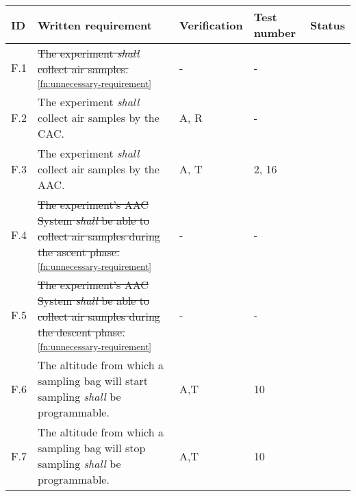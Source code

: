 \makeatletter
\renewcommand\@makefntext[1]{\leftskip=3em\hskip-1em\@makefnmark#1}
\makeatother

\begin{longtable}[]{|m{}| m{} |m{} |m{}|m{}|}

\hline
ID   & Written requirement                                                                                                                                                     & Verification & Test number & Status \\ \hline
F.1  & \st{The experiment \textit{shall} collect air samples.}\textsuperscript{\ref{fn:unnecessary-requirement}}                                                                                                                               &      -        &  -           &        \\ \hline
F.2  & The experiment \textit{shall} collect air samples by the CAC.                                                                                         &      A, R        &  -           &        \\ \hline
F.3  & The experiment \textit{shall} collect air samples by the AAC.                                                                                                                  &     A, T         &  2, 16           &        \\ \hline
F.4  & \st{The experiment's AAC System \textit{shall} be able to collect air samples during the ascent phase.}\textsuperscript{\ref{fn:unnecessary-requirement}}                                                                               &     -        & -     &        \\ \hline
F.5  & \st{The experiment's AAC System \textit{shall} be able to collect air samples during the descent phase.}\textsuperscript{\ref{fn:unnecessary-requirement}}                                                                               &      - & -    &        \\ \hline
F.6  & The altitude from which a sampling bag will start sampling \textit{shall} be programmable.                                                                                       &     A,T         &  10           &        \\ \hline
F.7  & The altitude from which a sampling bag will stop sampling \textit{shall} be programmable.                                                                                        &    A,T          & 10            &        \\ \hline

\end{longtable}
